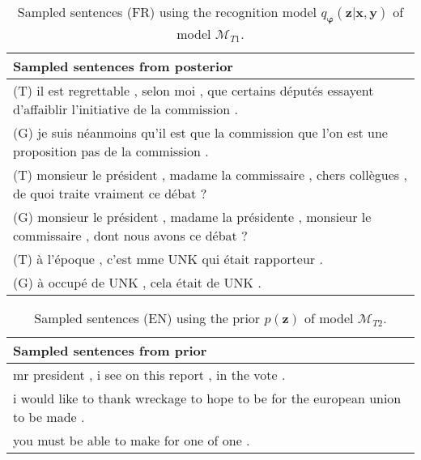 \begin{table}
  \centering
  \begin{tabular}{|L{14cm}|} 
    \hline
    Sampled sentences from posterior\\ [0.5ex] 
    \hline\hline
    (T) il est regrettable , selon moi , que certains députés essayent d'affaiblir l'initiative de la commission .\\
    (G) je suis néanmoins qu'il est que la commission que l'on est une proposition pas de la commission .\\
    \hline
    (T) monsieur le président , madame la commissaire , chers collègues , de quoi traite vraiment ce débat ?\\
    (G) monsieur le président , madame la présidente , monsieur le commissaire , dont nous avons ce débat ?\\
    \hline
    (T) à l’époque , c’est mme UNK qui était rapporteur .\\
    (G) à occupé de UNK , cela était de UNK .\\
    \hline
  \end{tabular}
  \caption{Sampled sentences (FR) using the recognition model
    $q_{\bm{\varphi}}(\bm{z} | \bm{x}, \bm{y})$ of model $\mathcal{M}_{T1}$.}
\end{table}

\begin{table}
  \centering
  \begin{tabular}{|L{14cm}|} 
    \hline
    Sampled sentences from prior\\
    \hline\hline
    mr president , i see on this report , in the vote .\\
    \hline
    i would like to thank wreckage to hope to be for the european union to be made .\\
    \hline
    you must be able to make for one of one .\\
    \hline
  \end{tabular}
  \caption{Sampled sentences (EN) using the prior $p(\bm{z})$ of model $\mathcal{M}_{T2}$.}
\end{table}

